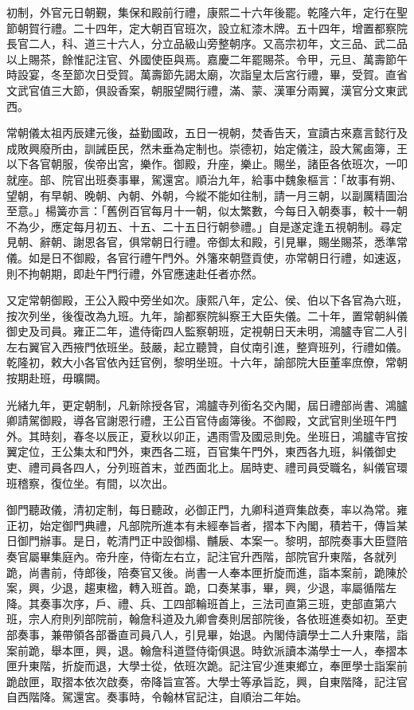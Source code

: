 \begin{pinyinscope}
初制，外官元日朝覲，集保和殿前行禮，康熙二十六年後罷。乾隆六年，定行在聖節朝賀行禮。二十四年，定大朝百官班次，設立紅漆木牌。五十四年，增置都察院長官二人，科、道三十六人，分立品級山旁整朝序。又高宗初年，文三品、武二品以上賜茶，餘惟記注官、外國使臣與焉。嘉慶二年罷賜茶。令甲，元旦、萬壽節午時設宴，冬至節次日受賀。萬壽節先謁太廟，次詣皇太后宮行禮，畢，受賀。直省文武官值三大節，俱設香案，朝服望闕行禮，滿、蒙、漢軍分兩翼，漢官分文東武西。

常朝儀太祖丙辰建元後，益勤國政，五日一視朝，焚香告天，宣讀古來嘉言懿行及成敗興廢所由，訓誡臣民，然未垂為定制也。崇德初，始定儀注，設大駕鹵簿，王以下各官朝服，俟帝出宮，樂作。御殿，升座，樂止。賜坐，諸臣各依班次，一叩就座。部、院官出班奏事畢，駕還宮。順治九年，給事中魏象樞言：「故事有朔、望朝，有早朝、晚朝、內朝、外朝，今縱不能如往制，請一月三朝，以副厲精圖治至意。」楊簧亦言：「舊例百官每月十一朝，似太繁數，今每日入朝奏事，較十一朝不為少，應定每月初五、十五、二十五日行朝參禮。」自是遂定逢五視朝制。尋定見朝、辭朝、謝恩各官，俱常朝日行禮。帝御太和殿，引見畢，賜坐賜茶，悉準常儀。如是日不御殿，各官行禮午門外。外籓來朝暨貢使，亦常朝日行禮，如速返，則不拘朝期，即赴午門行禮，外官應速赴任者亦然。

又定常朝御殿，王公入殿中旁坐如次。康熙八年，定公、侯、伯以下各官為六班，按次列坐，後復改為九班。九年，諭都察院糾察王大臣失儀。二十年，置常朝糾儀御史及司員。雍正二年，遣侍衛四人監察朝班，定視朝日天未明，鴻臚寺官二人引左右翼官入西掖門依班坐。鼓嚴，起立聽贊，自仗南引進，整齊班列，行禮如儀。乾隆初，敕大小各官依內廷官例，黎明坐班。十六年，諭部院大臣董率庶僚，常朝按期赴班，毋曠闕。

光緒九年，更定朝制，凡新除授各官，鴻臚寺列銜名交內閣，屆日禮部尚書、鴻臚卿請駕御殿，導各官謝恩行禮，王公百官侍鹵簿後。不御殿，文武官則坐班午門外。其時刻，春冬以辰正，夏秋以卯正，遇雨雪及國忌則免。坐班日，鴻臚寺官按翼定位，王公集太和門外，東西各二班，百官集午門外，東西各九班，糾儀御史吏、禮司員各四人，分列班首末，並西面北上。屆時吏、禮司員受職名，糾儀官環班稽察，復位坐。有間，以次出。

御門聽政儀，清初定制，每日聽政，必御正門，九卿科道齊集啟奏，率以為常。雍正初，始定御門典禮，凡部院所進本有未經奉旨者，摺本下內閣，積若干，傳旨某日御門辦事。是日，乾清門正中設御榻、黼扆、本案一。黎明，部院奏事大臣暨陪奏官屬畢集庭內。帝升座，侍衛左右立，記注官升西階，部院官升東階，各就列跪，尚書前，侍郎後，陪奏官又後。尚書一人奉本匣折旋而進，詣本案前，跪陳於案，興，少退，趨東楹，轉入班首。跪，口奏某事，畢，興，少退，率屬循階左降。其奏事次序，戶、禮、兵、工四部輪班首上，三法司直第三班，吏部直第六班，宗人府則列部院前，翰詹科道及九卿會奏則居部院後，各依班進奏如初。至吏部奏事，兼帶領各部番直司員八人，引見畢，始退。內閣侍讀學士二人升東階，詣案前跪，舉本匣，興，退。翰詹科道暨侍衛俱退。時欽派讀本滿學士一人，奉摺本匣升東階，折旋而退，大學士從，依班次跪。記注官少進東鄉立，奉匣學士詣案前跪啟匣，取摺本依次啟奏，帝降旨宣答。大學士等承旨訖，興，自東階降，記注官自西階降。駕還宮。奏事時，令翰林官記注，自順治二年始。


\end{pinyinscope}
